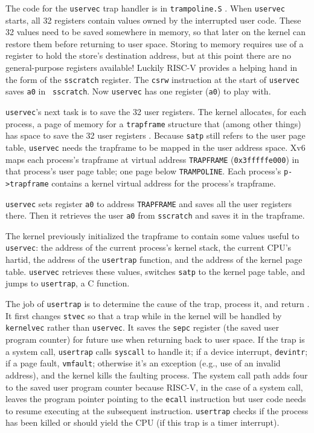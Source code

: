 The code for the {\tt uservec} trap handler is in {\tt trampoline.S}
.
When {\tt uservec} starts, all 32 registers contain values owned by
the interrupted user code. These 32 values need to be saved somewhere
in memory, so that later on
the kernel can restore them before returning to user space.
Storing to memory requires use of a register
to hold the store's destination address,
but at this point there are no general-purpose registers available!
Luckily RISC-V provides a helping hand in the
form of the {\tt sscratch} register. The {\tt csrw} instruction at
the start of {\tt uservec} saves {\tt a0} in {\tt
  sscratch}. Now 
{\tt uservec} has
one register ({\tt a0}) to play with.

{\tt uservec}'s next task is to save the 32 user registers.
The kernel allocates, for each process, a page of memory for a
{\tt trapframe} structure that (among other things) has space to
save the 32 user registers
. Because {\tt satp} still
refers to the user page table, {\tt uservec} needs the trapframe to be
mapped in the user address space. Xv6 maps each process's trapframe
at virtual address {\tt TRAPFRAME} ({\tt 0x3fffffe000}) in that process's user page table;
one page below {\tt TRAMPOLINE}.
Each process's {\tt p->trapframe} 
contains a kernel virtual address for the process's trapframe.

{\tt uservec} sets register {\tt a0} to address {\tt TRAPFRAME}
and saves all the user registers there.
Then it retrieves the user {\tt a0} from {\tt sscratch} and
saves it in the trapframe.

The kernel previously initialized the trapframe to contain some
values useful to {\tt uservec}:
the address of the current process's
kernel stack, the current CPU's hartid, the address of the {\tt usertrap}
function,
and the address of the kernel page table. {\tt uservec}
retrieves these values, switches {\tt satp} to the kernel page table,
and jumps to {\tt usertrap}, a C function.

The job of {\tt usertrap} is to determine
the cause of the trap, process it, and return
.
It first changes {\tt stvec} so
that a trap while in the kernel will be handled by
{\tt kernelvec} rather than {\tt uservec}.
It saves the {\tt sepc} register (the saved user program counter)
for future use when returning back to user space.
If the trap is a system call, {\tt usertrap} calls {\tt syscall} to
handle it;
if a device interrupt, {\tt devintr};
if a page fault,  {\tt vmfault};
otherwise it's an exception (e.g., use of an invalid address),
and the kernel kills the faulting process.
The system call path adds four to the saved user program counter
because RISC-V, in the case of a system call,
leaves the program pointer pointing to the {\tt ecall} instruction
but user code needs to resume executing at the subsequent instruction.
{\tt usertrap} checks if the process has been
killed or should yield the CPU (if this trap is a timer interrupt).

